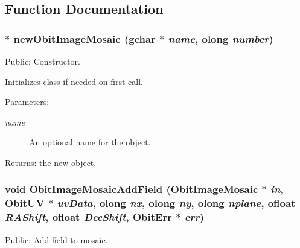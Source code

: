 \subsection{Function Documentation}
\subsubsection{$\ast$ new\-Obit\-Image\-Mosaic (gchar $\ast$ {\em name}, {\bf olong} {\em number})}\label{ObitImageMosaic_8h_a6}


Public: Constructor. 

Initializes class if needed on first call. \begin{Desc}
\item[Parameters:]
\begin{description}
\item[{\em name}]An optional name for the object. \end{description}
\end{Desc}
\begin{Desc}
\item[Returns:]the new object. \end{Desc}
\subsubsection{\setlength{\rightskip}{0pt plus 5cm}void Obit\-Image\-Mosaic\-Add\-Field ({\bf Obit\-Image\-Mosaic} $\ast$ {\em in}, {\bf Obit\-UV} $\ast$ {\em uv\-Data}, {\bf olong} {\em nx}, {\bf olong} {\em ny}, {\bf olong} {\em nplane}, {\bf ofloat} {\em RAShift}, {\bf ofloat} {\em Dec\-Shift}, {\bf Obit\-Err} $\ast$ {\em err})}\label{ObitImageMosaic_8h_a25}


Public: Add field to mosaic. 

